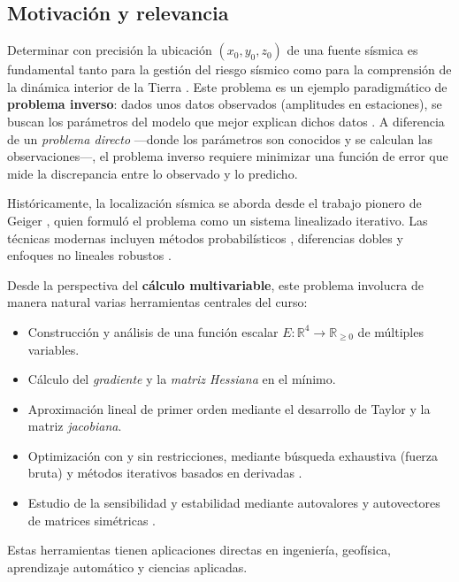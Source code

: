 \documentclass[12pt, a4paper]{article}
\begin{document}
\subsection{Motivación y relevancia}

Determinar con precisión la ubicación $(x_0, y_0, z_0)$ de una fuente
sísmica es fundamental tanto para la gestión del riesgo sísmico como
para la comprensión de la dinámica interior de la Tierra
\cite{husen2010earthquake}. Este problema es un ejemplo paradigmático
de \textbf{problema inverso}: dados unos datos observados (amplitudes
en estaciones), se buscan los parámetros del modelo que mejor explican
dichos datos \cite{aster2019parameter, tarantola2005inverse}. A
diferencia de un \textit{problema directo} —donde los parámetros son
conocidos y se calculan las observaciones—, el problema inverso
requiere minimizar una función de error que mide la discrepancia
entre lo observado y lo predicho.

Históricamente, la localización sísmica se aborda desde el trabajo
pionero de Geiger \cite{geiger1912probability}, quien formuló el
problema como un sistema linealizado iterativo. Las técnicas modernas
incluyen métodos probabilísticos \cite{lomax2000probabilistic},
diferencias dobles \cite{waldhauser2000double} y enfoques no lineales
robustos \cite{thurber1985nonlinear}.

Desde la perspectiva del \textbf{cálculo multivariable}, este problema
involucra de manera natural varias herramientas centrales del curso:

\begin{itemize}[leftmargin=*, itemsep=2pt]
    \item Construcción y análisis de una función escalar
    $E:\mathbb{R}^4 \to \mathbb{R}_{\geq 0}$ de múltiples variables.
    \item Cálculo del \emph{gradiente} y la \emph{matriz Hessiana} en
    el mínimo.
    \item Aproximación lineal de primer orden mediante el desarrollo
    de Taylor y la matriz \emph{jacobiana}.
    \item Optimización con y sin restricciones, mediante búsqueda
    exhaustiva (fuerza bruta) y métodos iterativos basados en
    derivadas \cite{nocedal2006numerical}.
    \item Estudio de la sensibilidad y estabilidad mediante autovalores
    y autovectores de matrices simétricas \cite{golub2013matrix}.
\end{itemize}

Estas herramientas tienen aplicaciones directas en ingeniería,
geofísica, aprendizaje automático y ciencias aplicadas.
\end{document}
